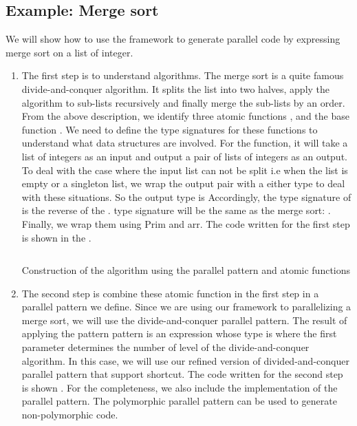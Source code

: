 \subsection{Example: Merge sort}

We will show how to use the framework to generate parallel code by expressing merge sort on a list of integer.
\begin{enumerate}
\begin{listing}[ht]
\begin{verbatim}
split :: SArrow [Int] (Either (Either () Int) ([Int], [Int]))
split = arr $ Prim "split" undefined
    
merge :: SArrow (Either (Either () Int) ([Int], [Int])) [Int]
merge = arr $ Prim "merge" undefined
    
sort :: SArrow [Int] [Int]
sort = arr $ Prim "sort" undefined
\end{verbatim}
\caption{The code for atomic functions}
\label{eval:code:step1}
\end{listing}
    \item The first step is to understand algorithms. The merge sort is a quite famous divide-and-conquer algorithm. It splits the list into two halves, apply the algorithm to sub-lists recursively and finally merge the sub-lists by an order. From the above description, we identify three atomic functions ,  and the base function .  We need to define the type signatures for these functions to understand what data structures are involved. For the  function, it will take a list of integers \hask{[Int]} as an input and output a pair of lists of integers  as an output. To deal with the case where the input list can not be split i.e when the list is empty or a singleton list, we wrap the output pair with a either type to deal with these situations. So the output type is  Accordingly, the type signature of  is the reverse of the .  type signature will be the same as the merge sort: \hask{[Int] -> [Int]}. Finally, we wrap them using Prim and arr. The code written for the first step is shown in the .
\begin{listing}[ht]
\inputminted{Haskell}{eval/step2.hs}
\caption{Construction of the algorithm using the parallel pattern and atomic functions}
\label{eval:code:step2}
\end{listing}
    \item The second step is combine these atomic function in the first step in a parallel pattern we define. Since we are using our framework to parallelizing a merge sort, we will use the divide-and-conquer parallel pattern. The result of applying the pattern pattern is an expression whose type is  where the first parameter determines the number of level of the divide-and-conquer algorithm. In this case, we will use our refined version of divided-and-conquer parallel pattern that support shortcut. The code written for the second step is shown . For the completeness, we also include the implementation of the parallel pattern. The polymorphic parallel pattern can be used to generate non-polymorphic code. 

\end{enumerate}
